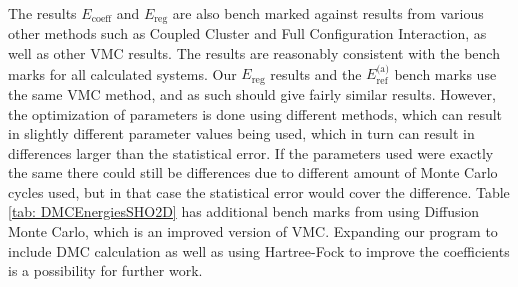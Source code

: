 \documentclass[../main.tex]{subfiles}
\begin{document}
The results $E_\textrm{coeff}$ and $E_\textrm{reg}$ are also bench marked against results from various other methods such as Coupled Cluster and Full Configuration Interaction, as well as other VMC results. The results are reasonably consistent with the bench marks for all calculated systems. Our $E_\textrm{reg}$ results and the $E_\textrm{ref}^\textrm{(a)}$ bench marks use the same VMC method, and as such should give fairly similar results. However, the optimization of parameters is done using different methods, which can result in slightly different parameter values being used, which in turn can result in differences larger than the statistical error. If the parameters used were exactly the same there could still be differences due to different amount of Monte Carlo cycles used, but in that case the statistical error would cover the difference. Table \ref{tab: DMCEnergiesSHO2D} has additional bench marks from using Diffusion Monte Carlo, which is an improved version of VMC. Expanding our program to include DMC calculation as well as using Hartree-Fock to improve the coefficients is a possibility for further work.
\end{document}
